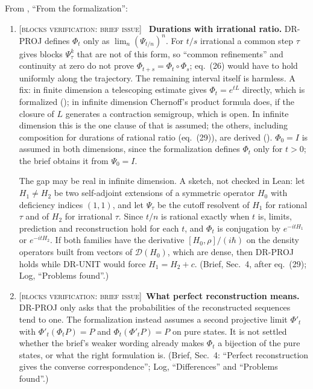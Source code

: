 \documentclass[11pt]{article}
\newcommand{\blocker}[1]{\textsc{[blocks verification: #1]}~}
\begin{document}
From , ``From the formalization'':
\begin{enumerate}
\item \blocker{brief issue}
  \textbf{Durations with irrational ratio.}
  DR-PROJ defines $\Phi_t$ only as
  $\lim_n(\Psi_{t/n})^n$. For $t/s$ irrational a common step $\tau$ gives blocks $\Psi_\tau^k$ that
  are not of this form, so ``common refinements'' and continuity at zero do not prove
  $\Phi_{t+s} = \Phi_t\circ\Phi_s$; eq.~(26) would have to hold uniformly along the trajectory.
  The remaining interval itself is harmless. A fix: in finite dimension a telescoping estimate
  gives $\Phi_t = e^{tL}$ directly, which is formalized ();
  in infinite dimension Chernoff's product formula does, if the closure of $L$ generates a
  contraction semigroup, which is open. In infinite dimension this is the one clause of
   that is assumed; the others, including composition for durations of
  rational ratio (eq.~(29)), are derived (). $\Phi_0 = I$ is
  assumed in both dimensions, since the formalization defines $\Phi_t$ only for $t > 0$; the brief
  obtains it from $\Psi_0 = I$.

  The gap may be real in infinite dimension. A sketch, not checked in Lean: let $H_1 \ne H_2$ be
  two self-adjoint extensions of a symmetric operator $H_0$ with deficiency indices $(1,1)$, and let
  $\Psi_\tau$ be the cutoff resolvent of $H_1$ for rational $\tau$ and of $H_2$ for irrational
  $\tau$. Since $t/n$ is rational exactly when $t$ is, limits, prediction and reconstruction hold
  for each $t$, and $\Phi_t$ is conjugation by $e^{-itH_1}$ or $e^{-itH_2}$. If both families have
  the derivative $[H_0,\rho]/(i\hbar)$ on the density operators built from vectors of
  $\mathcal{D}(H_0)$, which are dense, then DR-PROJ holds while DR-UNIT would force
  $H_1 = H_2 + c$. (Brief, Sec.~4, after eq.~(29); Log, ``Problems found''.)
\item \blocker{brief issue}\textbf{What perfect reconstruction means.}
  DR-PROJ only asks that the probabilities of
  the reconstructed sequences tend to one. The formalization instead assumes a second projective
  limit $\Phi'_t$ with $\Phi'_t(\Phi_t P) = P$ and $\Phi_t(\Phi'_t P) = P$ on pure states. It is
  not settled whether the brief's weaker wording already makes $\Phi_t$ a bijection of the pure
  states, or what the right formulation is. (Brief, Sec.~4: ``Perfect reconstruction gives the
  converse correspondence''; Log, ``Differences'' and ``Problems found''.)
\end{enumerate}
\end{document}
